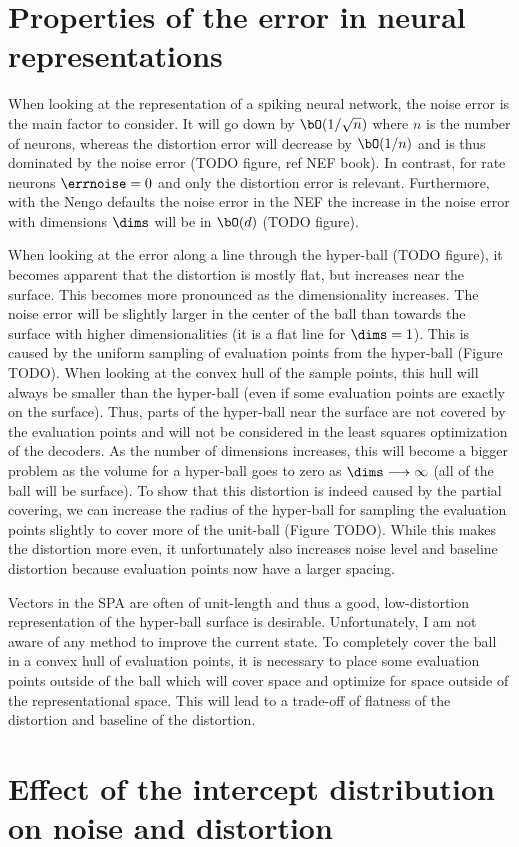 \section{Properties of the error in neural representations}
When looking at the representation of a spiking neural network, the noise error is the main factor to consider.
It will go down by $\bO(1/\sqrt{n})$ where $n$ is the number of neurons, whereas the distortion error will decrease by $\bO(1/n)$ and is thus dominated by the noise error (TODO figure, ref NEF book).
In contrast, for rate neurons $\errnoise = 0$ and only the distortion error is relevant.
Furthermore, with the Nengo defaults the noise error in the NEF the increase in the noise error with dimensions $\dims$ will be in $\bO(d)$ (TODO figure).

When looking at the error along a line through the hyper-ball (TODO figure), it becomes apparent that the distortion is mostly flat, but increases near the surface.
This becomes more pronounced as the dimensionality increases.
The noise error will be slightly larger in the center of the ball than towards the surface with higher dimensionalities (it is a flat line for $\dims = 1$).
This is caused by the uniform sampling of evaluation points from the hyper-ball (Figure TODO).
When looking at the convex hull of the sample points, this hull will always be smaller than the hyper-ball (even if some evaluation points are exactly on the surface).
Thus, parts of the hyper-ball near the surface are not covered by the evaluation points and will not be considered in the least squares optimization of the decoders.
As the number of dimensions increases, this will become a bigger problem as the volume for a hyper-ball goes to zero as $\dims \longrightarrow \infty$ (all of the ball will be surface).
To show that this distortion is indeed caused by the partial covering, we can increase the radius of the hyper-ball for sampling the evaluation points slightly to cover more of the unit-ball (Figure TODO).
While this makes the distortion more even, it unfortunately also increases noise level and baseline distortion because evaluation points now have a larger spacing.

Vectors in the SPA are often of unit-length and thus a good, low-distortion representation of the hyper-ball surface is desirable.
Unfortunately, I am not aware of any method to improve the current state.
To completely cover the ball in a convex hull of evaluation points, it is necessary to place some evaluation points outside of the ball which will cover space and optimize for space outside of the representational space.
This will lead to a trade-off of flatness of the distortion and baseline of the distortion.


\section{Effect of the intercept distribution on noise and distortion}

